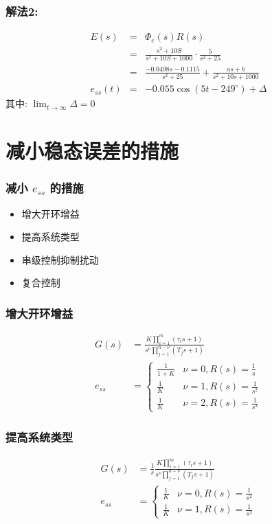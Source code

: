 \documentclass{beamer}
\begin{document}
\begin{frame}
\frametitle{解法2:}
\label{sec-3-10}

\begin{eqnarray*}
E(s) & = & \Phi_e(s)R(s) \\
     &=& \frac{s^2+10S}{s^2+10S+1000}\cdot\frac{5}{s^2+25}\\
     &=&\frac{-0.0498s-0.1115}{s^2+25}+\frac{as+b}{s^2+10s+1000}\\
e_{ss}(t)&=& -0.055\cos(5t-249^{\circ})+\Delta 
\end{eqnarray*}
其中: $\lim_{t\rightarrow\infty}\Delta = 0$
\end{frame}
\section{减小稳态误差的措施}
\label{sec-4}
\begin{frame}
\frametitle{减小 $e_{ss}$ 的措施}
\label{sec-4-1}

\begin{itemize}
\item <2->增大开环增益
\item <3->提高系统类型
\item <4->串级控制抑制扰动
\item <5->复合控制
\end{itemize}
\end{frame}
\begin{frame}
\frametitle{增大开环增益}
\label{sec-4-2}

\begin{align*}
G(s)    & = \frac{K\prod_{i=1}^{m}(\tau_{i}s+1)}{s^{\nu}\prod_{j=1}^{n-\nu}(T_{j}s+1)} \\
e_{ss}  &=
\begin{cases}
\frac{1}{1+K} & \nu=0,R(s)=\frac{1}{s} \\
\frac{1}{K} & \nu=1,R(s)=\frac{1}{s^2} \\
\frac{1}{K} & \nu=2,R(s)=\frac{1}{s^3} 
\end{cases}
\end{align*}
\end{frame}
\begin{frame}
\frametitle{提高系统类型}
\label{sec-4-3}

\begin{align*}
G(s)    & = \frac{1}{s}\frac{K\prod_{i=1}^{m}(\tau_{i}s+1)}{s^{\nu}\prod_{j=1}^{n-\nu}(T_{j}s+1)} \\
e_{ss}  &=
\begin{cases}
\frac{1}{K} & \nu=0,R(s)=\frac{1}{s^2} \\
\frac{1}{K} & \nu=1,R(s)=\frac{1}{s^3} 
\end{cases}
\end{align*}
\end{frame}
\end{document}
